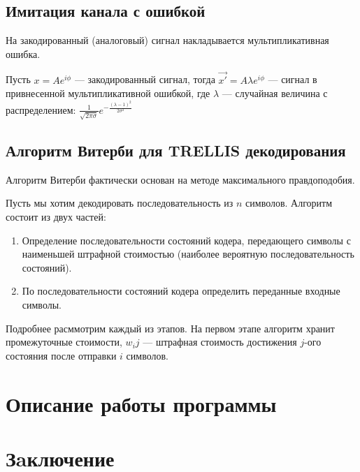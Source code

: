 \documentclass[a4paper,12pt]{article}
\begin{document}
\subsection{Имитация канала с ошибкой}
На закодированный (аналоговый) сигнал накладывается мультипликативная ошибка. 

Пусть $x = A e^{i\phi}$ --- закодированный сигнал, тогда $\vec{x'} = A\lambda e^{i\phi}$ --- сигнал в привнесенной
мультипликативной ошибкой, где $\lambda$ --- случайная величина с распределением: 
$\frac{1}{\sqrt{2\pi\sigma}}e^{-\frac{(\lambda - 1)^2}{2\sigma^2}}$

\subsection{Алгоритм Витерби для TRELLIS декодирования}
Алгоритм Витерби фактически основан на методе максимального правдоподобия.

Пусть мы хотим декодировать последовательность из $n$ символов. Алгоритм состоит из двух частей:
\begin{enumerate}
	\item Определение последовательности состояний кодера, передающего символы с наименьшей штрафной стоимостью
		(наиболее вероятную последовательность состояний).
	\item По последовательности состояний кодера определить переданные входные символы.
\end{enumerate}

Подробнее расммотрим каждый из этапов. На первом этапе алгоритм хранит промежуточные стоимости, $w_ij$ --- штрафная
стоимость достижения $j$-ого состояния после отправки $i$ символов.

\section{Описание работы программы}

\section{Зaключение}


\end{document}
